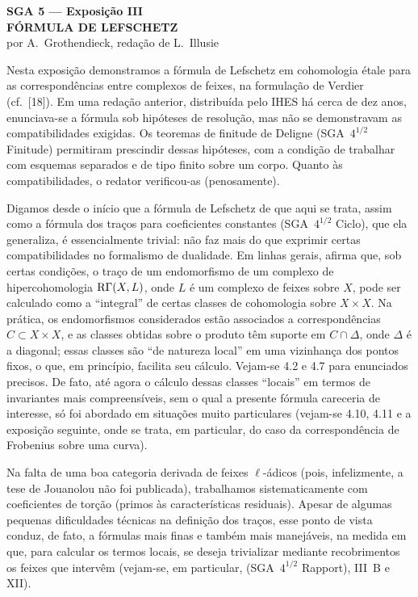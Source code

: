 \clearpage
\begin{center}
{\Large \textbf{SGA 5 --- Exposição III}}\\[0.4em]
{\large \textbf{FÓRMULA DE LEFSCHETZ}}\\[0.3em]
por A.~Grothendieck, redação de L.~Illusie
\end{center}
\enlargethispage{-2\baselineskip}

Nesta exposição demonstramos a fórmula de Lefschetz em cohomologia étale para as correspondências entre complexos de feixes, na formulação de Verdier (cf.~[18]). Em uma redação anterior, distribuída pelo IHES há cerca de dez anos, enunciava-se a fórmula sob hipóteses de resolução, mas não se demonstravam as compatibilidades exigidas. Os teoremas de finitude de Deligne (SGA~$4^{1/2}$ Finitude) permitiram prescindir dessas hipóteses, com a condição de trabalhar com esquemas separados e de tipo finito sobre um corpo. Quanto às compatibilidades, o redator verificou-as (penosamente).

Digamos desde o início que a fórmula de Lefschetz de que aqui se trata, assim como a fórmula dos traços para coeficientes constantes (SGA~$4^{1/2}$ Ciclo), que ela generaliza, é essencialmente trivial: não faz mais do que exprimir certas compatibilidades no formalismo de dualidade. Em linhas gerais, afirma que, sob certas condições, o traço de um endomorfismo de um complexo de hipercohomologia $\mathrm{R}\Gamma(X,L)$, onde $L$ é um complexo de feixes sobre $X$, pode ser calculado como a ``integral'' de certas classes de cohomologia sobre $X \times X$. Na prática, os endomorfismos considerados estão associados a correspondências $C \subset X \times X$, e as classes obtidas sobre o produto têm suporte em $C \cap \Delta$, onde $\Delta$ é a diagonal; essas classes são ``de natureza local'' em uma vizinhança dos pontos fixos, o que, em princípio, facilita seu cálculo. Vejam-se 4.2 e 4.7 para enunciados precisos. De fato, até agora o cálculo dessas classes ``locais'' em termos de invariantes mais compreensíveis, sem o qual a presente fórmula careceria de interesse, só foi abordado em situações muito particulares (vejam-se 4.10, 4.11 e a exposição seguinte, onde se trata, em particular, do caso da correspondência de Frobenius sobre uma curva).

Na falta de uma boa categoria derivada de feixes $\ell$-ádicos (pois, infelizmente, a tese de Jouanolou não foi publicada), trabalhamos sistematicamente com coeficientes de torção (primos às características residuais). Apesar de algumas pequenas dificuldades técnicas na definição dos traços, esse ponto de vista conduz, de fato, a fórmulas mais finas e também mais manejáveis, na medida em que, para calcular os termos locais, se deseja trivializar mediante recobrimentos os feixes que intervêm (vejam-se, em particular, (SGA~$4^{1/2}$ Rapport), III~B e XII).

